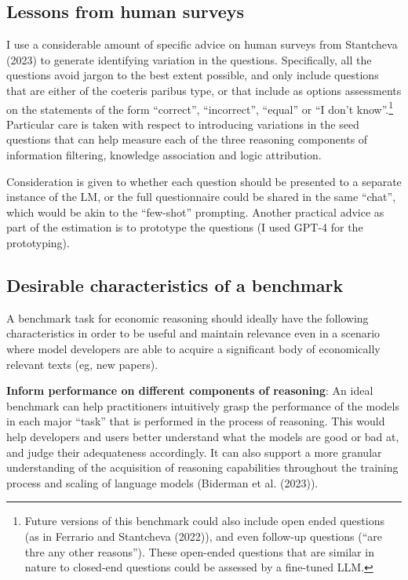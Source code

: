 \documentclass[
]{article}
\theoremstyle{plain}
\theoremstyle{definition}
\theoremstyle{remark}
\begin{document}
\subsection{Lessons from human
surveys}\label{lessons-from-human-surveys}

I use a considerable amount of specific advice on human surveys from
Stantcheva (2023) to generate identifying variation in the questions.
Specifically, all the questions avoid jargon to the best extent
possible, and only include questions that are either of the coeteris
paribus type, or that include as options assessments on the statements
of the form ``correct'', ``incorrect'', ``equal'' or ``I don't
know''.\footnote{Future versions of this benchmark could also include
  open ended questions (as in Ferrario and Stantcheva (2022)), and even
  follow-up questions (``are thre any other reasons''). These open-ended
  questions that are similar in nature to closed-end questions could be
  assessed by a fine-tuned LLM.} Particular care is taken with respect
to introducing variations in the seed questions that can help measure
each of the three reasoning components of information filtering,
knowledge association and logic attribution.

Consideration is given to whether each question should be presented to a
separate instance of the LM, or the full questionnaire could be shared
in the same ``chat'', which would be akin to the ``few-shot'' prompting.
Another practical advice as part of the estimation is to prototype the
questions (I used GPT-4 for the prototyping).

\subsection{Desirable characteristics of a
benchmark}\label{desirable-characteristics-of-a-benchmark}

A benchmark task for economic reasoning should ideally have the
following characteristics in order to be useful and maintain relevance
even in a scenario where model developers are able to acquire a
significant body of economically relevant texts (eg, new papers).

\textbf{Inform performance on different components of reasoning}: An
ideal benchmark can help practitioners intuitively grasp the performance
of the models in each major ``task'' that is performed in the process of
reasoning. This would help developers and users better understand what
the models are good or bad at, and judge their adequateness accordingly.
It can also support a more granular understanding of the acquisition of
reasoning capabilities throughout the training process and scaling of
language models (Biderman et al. (2023)).
\end{document}
